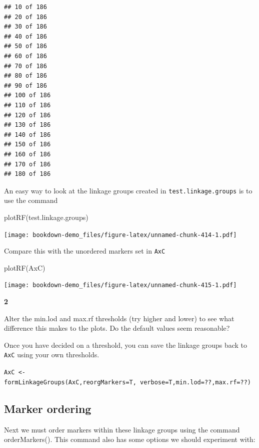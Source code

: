 \documentclass[
]{book}
\makeatletter
\newenvironment{Shaded}{\begin{snugshade}}{\end{snugshade}}
\newcommand{\FunctionTok}[1]{\textcolor[rgb]{0.00,0.00,0.00}{#1}}
\newcommand{\NormalTok}[1]{#1}
\newenvironment{kframe}{%
\medskip{}
\setlength{\fboxsep}{.8em}
 \def\at@end@of@kframe{}%
 \ifinner\ifhmode%
  \def\at@end@of@kframe{\end{minipage}}%
  \begin{minipage}{\columnwidth}%
 \fi\fi%
 \def\FrameCommand##1{\hskip\@totalleftmargin \hskip-\fboxsep
 \colorbox{shadecolor}{##1}\hskip-\fboxsep
     \hskip-\linewidth \hskip-\@totalleftmargin \hskip\columnwidth}%
 \MakeFramed {\advance\hsize-\width
   \@totalleftmargin\z@ \linewidth\hsize
   \@setminipage}}%
 {\par\unskip\endMakeFramed%
 \at@end@of@kframe}
\newenvironment{rmdblock}[1]
  {
  \begin{itemize}
  \renewcommand{\labelitemi}{
    \raisebox{-.7\height}[0pt][0pt]{
      {\setkeys{Gin}{width=3em,keepaspectratio}\texttt{[image: images/\#1]}}
    }
  }
  \setlength{\fboxsep}{1em}
  \begin{kframe}
  \item
  }
  {
  \end{kframe}
  \end{itemize}
  }
\newenvironment{rmdquiz}
  {\begin{rmdblock}{quiz}}
  {\end{rmdblock}}
\makeatother
\begin{document}
\begin{verbatim}
## 10 of 186 
## 20 of 186 
## 30 of 186 
## 40 of 186 
## 50 of 186 
## 60 of 186 
## 70 of 186 
## 80 of 186 
## 90 of 186 
## 100 of 186 
## 110 of 186 
## 120 of 186 
## 130 of 186 
## 140 of 186 
## 150 of 186 
## 160 of 186 
## 170 of 186 
## 180 of 186
\end{verbatim}

An easy way to look at the linkage groups created in \texttt{test.linkage.groups} is to use the command

\begin{Shaded}
\begin{Highlighting}[]
\FunctionTok{plotRF}\NormalTok{(test.linkage.groups)}
\end{Highlighting}
\end{Shaded}

\texttt{[image: bookdown-demo\_files/figure-latex/unnamed-chunk-414-1.pdf]}

Compare this with the unordered markers set in \texttt{AxC}

\begin{Shaded}
\begin{Highlighting}[]
\FunctionTok{plotRF}\NormalTok{(AxC)}
\end{Highlighting}
\end{Shaded}

\texttt{[image: bookdown-demo\_files/figure-latex/unnamed-chunk-415-1.pdf]}
\begin{rmdquiz}
\textbf{2}

Alter the min.lod and max.rf thresholds (try higher and lower) to see what difference this makes to the plots. Do the default values seem reasonable?
\end{rmdquiz}

Once you have decided on a threshold, you can save the linkage groups back to \texttt{AxC} using your own thresholds.

\texttt{AxC\ \textless{}-formLinkageGroups(AxC,reorgMarkers=T,\ verbose=T,min.lod=??,max.rf=??)}

\hypertarget{marker-ordering}{%
\subsection{Marker ordering}\label{marker-ordering}}

Next we must order markers within these linkage groups using the command orderMarkers(). This command also has some options we should experiment with:
\end{document}
